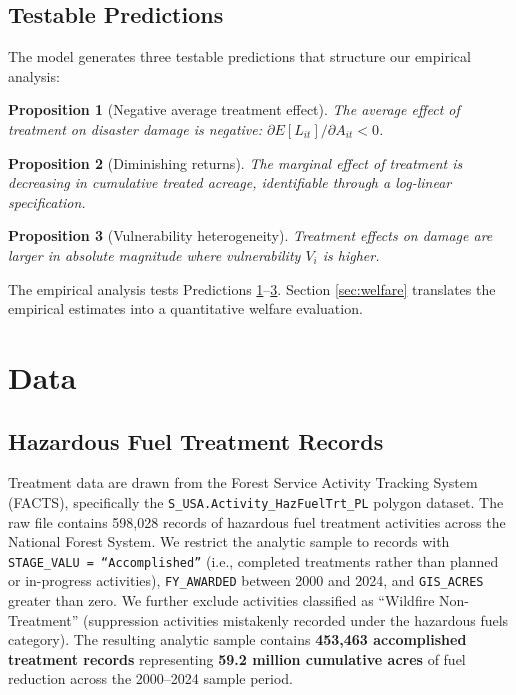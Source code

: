 \documentclass[12pt, letterpaper]{article}
\newtheorem{proposition}{Proposition}
\begin{document}
\subsection{Testable Predictions}

The model generates three testable predictions that structure our empirical analysis:

\begin{proposition}[Negative average treatment effect]
\label{prop:neg}
The average effect of treatment on disaster damage is negative: $\partial E[L_{it}] / \partial A_{it} < 0$.
\end{proposition}

\begin{proposition}[Diminishing returns]
\label{prop:dim}
The marginal effect of treatment is decreasing in cumulative treated acreage, identifiable through a log-linear specification.
\end{proposition}

\begin{proposition}[Vulnerability heterogeneity]
\label{prop:het}
Treatment effects on damage are larger in absolute magnitude where vulnerability $V_i$ is higher.
\end{proposition}

The empirical analysis tests Predictions \ref{prop:neg}--\ref{prop:het}. Section \ref{sec:welfare} translates the empirical estimates into a quantitative welfare evaluation.


\section{Data}\label{sec:data}

\subsection{Hazardous Fuel Treatment Records}

Treatment data are drawn from the Forest Service Activity Tracking System (FACTS), specifically the \texttt{S\_USA.Activity\_HazFuelTrt\_PL} polygon dataset. The raw file contains 598{,}028 records of hazardous fuel treatment activities across the National Forest System. We restrict the analytic sample to records with \texttt{STAGE\_VALU = ``Accomplished''} (i.e., completed treatments rather than planned or in-progress activities), \texttt{FY\_AWARDED} between 2000 and 2024, and \texttt{GIS\_ACRES} greater than zero. We further exclude activities classified as ``Wildfire Non-Treatment'' (suppression activities mistakenly recorded under the hazardous fuels category). The resulting analytic sample contains \textbf{453{,}463 accomplished treatment records} representing \textbf{59.2 million cumulative acres} of fuel reduction across the 2000--2024 sample period.
\end{document}
